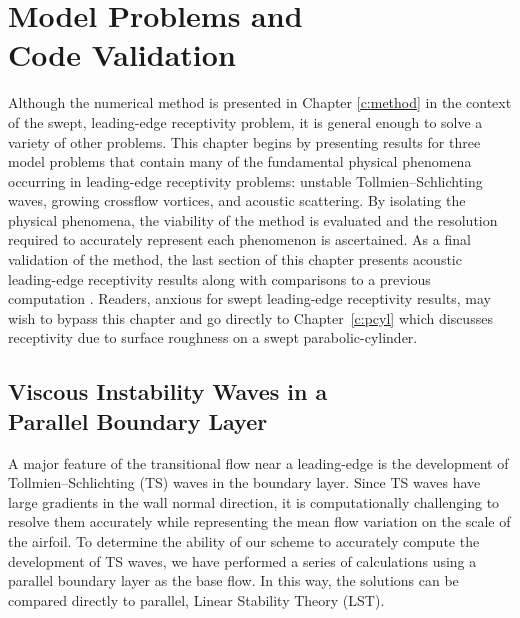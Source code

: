 %
%
%
%
%
\chapter[Model Problems and Code Validation]{Model Problems and \protect\\ 
         Code Validation \label{c:valid}}

Although the numerical method is presented in Chapter \ref{c:method} in the
context of the swept, leading-edge receptivity problem, it is general enough
to solve a variety of other problems.  This chapter begins by presenting
results for three model problems that contain many of the fundamental physical
phenomena occurring in leading-edge receptivity problems: unstable
Tollmien--Schlichting waves, growing crossflow vortices, and acoustic
scattering.  By isolating the physical phenomena, the viability of the method
is evaluated and the resolution required to accurately represent each
phenomenon is ascertained.  As a final validation of the method, the last
section of this chapter presents acoustic leading-edge receptivity results
along with comparisons to a previous computation \cite{Lin:92}.  Readers,
anxious for swept leading-edge receptivity results, may wish to bypass this
chapter and go directly to Chapter~\ref{c:pcyl} which discusses receptivity due
to surface roughness on a swept parabolic-cylinder.

\section[Viscous Instability Waves in a Parallel Boundary Layer]{Viscous 
Instability Waves in a \protect\\ Parallel Boundary Layer \label{s:TS}}

A major feature of the transitional flow near a leading-edge is the
development of Tollmien--Schlichting (TS) waves in the boundary layer.  Since
TS waves have large gradients in the wall normal direction, it is
computationally challenging to resolve them accurately while representing the
mean flow variation on the scale of the airfoil.  To determine the ability of
our scheme to accurately compute the development of TS waves, we have
performed a series of calculations using a parallel boundary layer as the base
flow.  In this way, the solutions can be compared directly to parallel, Linear
Stability Theory (LST).

